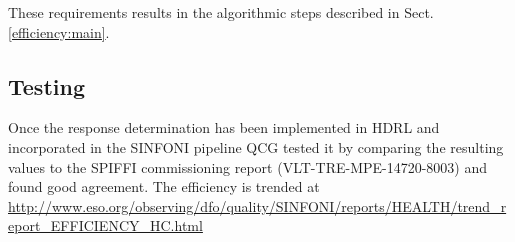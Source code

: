 These requirements results in the algorithmic steps described in
Sect.\,\ref{efficiency:main}.

\subsection{Testing}
Once the response determination has been implemented in HDRL and
incorporated in the SINFONI pipeline QCG tested it by comparing the
resulting values to the SPIFFI commissioning report
(VLT-TRE-MPE-14720-8003) and found good agreement. The efficiency is
trended at \url{http://www.eso.org/observing/dfo/quality/SINFONI/reports/HEALTH/trend_report_EFFICIENCY_HC.html}
